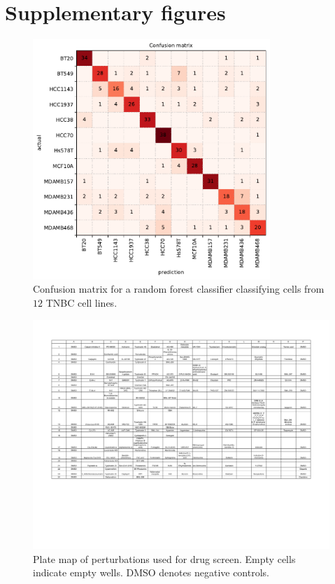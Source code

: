 
\chapter{Supplementary figures} %
\label{AppendixA} %


\begin{figure}[h!]
\centering
\includegraphics[width=0.8\textwidth]{img/confusion_matrix.pdf}
\caption{Confusion matrix for a random forest classifier classifying cells from $12$ TNBC cell lines.}
\label{fig:confusion_matrix}
\end{figure}

\begin{figure}
\centering
\includegraphics[width=\textwidth]{img/plate_map.pdf}
\caption{Plate map of perturbations used for drug screen. Empty cells indicate empty wells. DMSO denotes negative controls.}
\label{fig:plate_map_sideways}
\end{figure}

